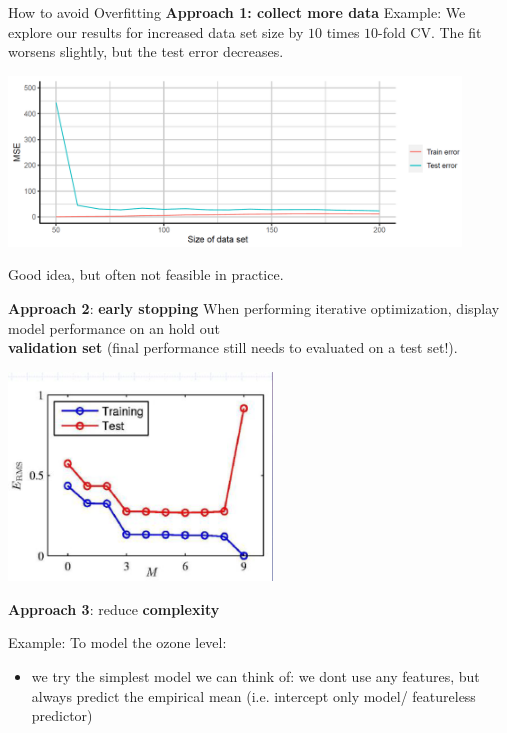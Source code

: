 \begin{vbframe}{How to avoid Overfitting}
\textbf{Approach 1: collect more data}
Example: We explore our results for increased data set size by \(10\) times
\(10\)-fold CV. The fit worsens slightly, but the test error decreases.

\vfill

\begin{center}
\includegraphics[width=0.9\textwidth]{plots/regularization02.png}
\end{center}

Good idea, but often not feasible in practice.

\framebreak

\textbf{Approach 2}: \textbf{early stopping}
When performing iterative optimization, display model performance on an hold out \\\textbf{validation set} (final performance still needs to evaluated on a test set!).

\begin{center}
\includegraphics[width=7cm]{plots/early_stopping.png}
\end{center}

\framebreak

\textbf{Approach 3}: reduce \textbf{complexity}

Example: 
To model the ozone level:
\begin{itemize}
\item we try the simplest model we can think of: we dont use any features, but always predict the empirical mean (i.e. intercept only model/ featureless predictor)


\end{itemize}
\end{vbframe}
